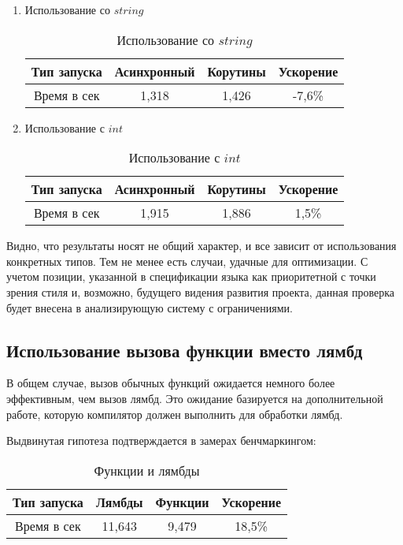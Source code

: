 \documentclass{mipt-thesis-bs}
\begin{document}
\begin{enumerate}
    \item Использование со $string$
    \begin{table}[h]
        \centering
        \begin{tabular}{|c|c|c|c|}
          \hline
          Тип запуска & Асинхронный & Корутины & Ускорение \\
          \hline
          Время в сек & 1,318 & 1,426 & -7,6\% \\
          \hline
        \end{tabular}
        \caption{Использование со $string$}
      \end{table}
    \item Использование с $int$
    \begin{table}[h]
        \centering
        \begin{tabular}{|c|c|c|c|}
          \hline
          Тип запуска & Асинхронный & Корутины & Ускорение \\
          \hline
          Время в сек & 1,915 & 1,886 & 1,5\% \\
          \hline
        \end{tabular}
        \caption{Использование с $int$}
      \end{table}
\end{enumerate}

Видно, что результаты носят не общий характер, и все зависит от использования
конкретных типов. Тем не менее есть случаи, удачные для оптимизации. С учетом
позиции, указанной в спецификации языка как приоритетной с точки зрения стиля и,
возможно, будущего видения развития проекта, данная проверка будет внесена в
анализирующую систему с ограничениями.

\subsection{Использование вызова функции вместо лямбд}

В общем случае, вызов обычных функций ожидается немного
более эффективным, чем вызов лямбд. Это ожидание базируется на
дополнительной работе, которую компилятор должен выполнить для обработки лямбд.

Выдвинутая гипотеза подтверждается в замерах бенчмаркингом:

\begin{table}[h]
    \centering
    \begin{tabular}{|c|c|c|c|}
      \hline
      Тип запуска & Лямбды & Функции & Ускорение \\
      \hline
      Время в сек & 11,643 & 9,479  & 18,5\% \\
      \hline
    \end{tabular}
    \caption{Функции и лямбды}
  \end{table}
\end{document}

